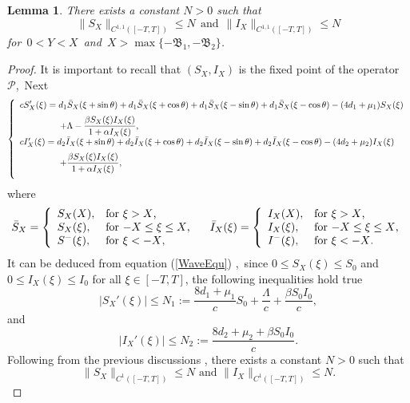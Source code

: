 \documentclass[final,3p,times]{elsarticle}
\newtheorem{lemma}{Lemma}[section]
\numberwithin{equation}{section}
\begin{document}
\begin{lemma}\label{L-2.9}
There exists a constant $N>0$ such that
\[\|S_X\|_{C^{1,1}( [-T, T])}\leq N~ ~\mathrm{and}~ ~\|I_X\|_{C^{1,1}( [-T, T])}\leq N
\]
for~$0<Y<X$~and~$X>\max\{-\mathfrak{B}_1,-\mathfrak{B}_2\}$.
\end{lemma}
\begin{proof}
It is important to recall that $(S_X, I_X)$ is the fixed point of the operator $\mathcal{P}$,~Next
\begin{equation}\label{WaveEqu1}
\left\{\begin{array}{l}
\vspace{2mm}
\displaystyle c S'_{X}(\xi)=d_1\bar{S}_{X}(\xi+\sin\theta)+d_1\bar{S}_{X}(\xi+\cos\theta)+d_1\bar{S}_{X}(\xi-\sin\theta)+d_1\bar{S}_{X}(\xi-\cos\theta)-(4d_{1}+\mu_{1})S_{X}(\xi)\\
\hspace{1.6cm}+\Lambda - \displaystyle\frac{\beta S_{X}(\xi)I_{X}(\xi)}{1+\alpha I_{X}(\xi)} ,\\
\vspace{2mm}
c I'_{X}(\xi) =
d_2\bar{I}_{X}(\xi+\sin\theta)+d_2\bar{I}_{X}(\xi+\cos\theta)+d_2\bar{I}_{X}(\xi-\sin\theta)+d_2\bar{I}_{X}(\xi-\cos\theta)-(4d_{2}+\mu_{2})I_{X}(\xi)\\
\vspace{2mm}
\displaystyle
\hspace{1.6cm}+\displaystyle\frac{\beta S_{X}(\xi)I_{X}(\xi)}{1+\alpha I_{X}(\xi)} ,
\end{array}\right.
\end{equation}
where
\begin{equation*}
\bar{S}_{X}=\left\{
\begin{array}{ll}
\displaystyle   S_{X}(X), &\mbox{for $\xi>X$,}
\\
\displaystyle   S_{X}(\xi), &\mbox{for $ -X \leq\xi \leq X$,}
\\
\displaystyle   S^-(\xi), &\mbox{for $\xi< -X$,}\\
\end{array}\right.\ \ \
\bar{I}_{X}(\xi)=\left\{
\begin{array}{ll}
\displaystyle   {I}_{X}(X), &\mbox{for $\xi>X$,}
\\
\displaystyle  {I}_{X}(\xi), &\mbox{for $-X \leq\xi \leq X$,}
\\
\displaystyle   I^-(\xi), &\mbox{for $\xi< -X$.}\\
\end{array}\right.
\end{equation*}
It can be deduced from equation (\ref{WaveEqu}) ,~since $0 \leq S_X(\xi) \leq S_0$ and $0 \leq I_X(\xi) \leq I_{0}$ for all $\xi \in [-T, T]$, the following inequalities hold true
\[
|S_X'(\xi)| \leq N_{1}:=\frac{8d_1+\mu_1}{c}S_0+\frac{\Lambda}{c}+\frac{\beta S_0 I_{0}}{c},
\]
and
\[
|I_X'(\xi)| \leq N_{2}:= \frac{8d_2+\mu_2+\beta S_0 I_{0}}{c}.
\]
Following from the previous discussions ,  there exists a constant $N>0$ such that
\[
\|S_X\|_{C^1( [-T, T])} \leq N \text{ and } \|I_X\|_{C^1( [-T, T])} \leq N.
\]


\end{proof}
\end{document}
